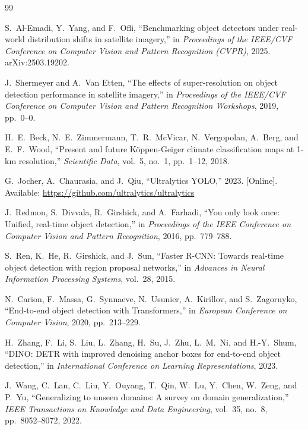 \documentclass[12pt,a4paper]{article}
\begin{document}
\begin{thebibliography}{99}

S.~Al-Emadi, Y.~Yang, and F.~Ofli, ``Benchmarking object detectors under real-world distribution shifts in satellite imagery,'' in \textit{Proceedings of the IEEE/CVF Conference on Computer Vision and Pattern Recognition (CVPR)}, 2025. arXiv:2503.19202.

J.~Shermeyer and A.~Van Etten, ``The effects of super-resolution on object detection performance in satellite imagery,'' in \textit{Proceedings of the IEEE/CVF Conference on Computer Vision and Pattern Recognition Workshops}, 2019, pp.~0--0.

H.~E.~Beck, N.~E.~Zimmermann, T.~R.~McVicar, N.~Vergopolan, A.~Berg, and E.~F.~Wood, ``Present and future K\"{o}ppen-Geiger climate classification maps at 1-km resolution,'' \textit{Scientific Data}, vol.~5, no.~1, pp.~1--12, 2018.

G.~Jocher, A.~Chaurasia, and J.~Qiu, ``Ultralytics YOLO,'' 2023. [Online]. Available: \url{https://github.com/ultralytics/ultralytics}

J.~Redmon, S.~Divvala, R.~Girshick, and A.~Farhadi, ``You only look once: Unified, real-time object detection,'' in \textit{Proceedings of the IEEE Conference on Computer Vision and Pattern Recognition}, 2016, pp.~779--788.

S.~Ren, K.~He, R.~Girshick, and J.~Sun, ``Faster R-CNN: Towards real-time object detection with region proposal networks,'' in \textit{Advances in Neural Information Processing Systems}, vol.~28, 2015.

N.~Carion, F.~Massa, G.~Synnaeve, N.~Usunier, A.~Kirillov, and S.~Zagoruyko, ``End-to-end object detection with Transformers,'' in \textit{European Conference on Computer Vision}, 2020, pp.~213--229.

H.~Zhang, F.~Li, S.~Liu, L.~Zhang, H.~Su, J.~Zhu, L.~M.~Ni, and H.-Y.~Shum, ``DINO: DETR with improved denoising anchor boxes for end-to-end object detection,'' in \textit{International Conference on Learning Representations}, 2023.

J.~Wang, C.~Lan, C.~Liu, Y.~Ouyang, T.~Qin, W.~Lu, Y.~Chen, W.~Zeng, and P.~Yu, ``Generalizing to unseen domains: A survey on domain generalization,'' \textit{IEEE Transactions on Knowledge and Data Engineering}, vol.~35, no.~8, pp.~8052--8072, 2022.


\end{thebibliography}
\end{document}
